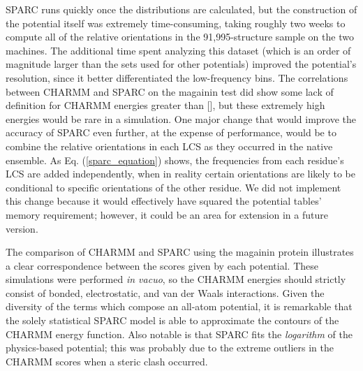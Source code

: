 \documentclass[11pt,titlepage]{article}
\begin{document}
SPARC runs quickly once the distributions are calculated, but the construction of the potential itself was extremely time-consuming, taking roughly two weeks to compute all of the relative orientations in the 91,995-structure sample on the two machines.
The additional time spent analyzing this dataset (which is an order of magnitude larger than the sets used for other potentials) improved the potential's resolution, since it better differentiated the low-frequency bins.
The correlations between CHARMM and SPARC on the magainin test did show some lack of definition for CHARMM energies greater than [], but these extremely high energies would be rare in a simulation.
One major change that would improve the accuracy of SPARC even further, at the expense of performance, would be to combine the relative orientations in each LCS as they occurred in the native ensemble.
As Eq. (\ref{sparc_equation}) shows, the frequencies from each residue's LCS are added independently, when in reality certain orientations are likely to be conditional to specific orientations of the other residue.
We did not implement this change because it would effectively have squared the potential tables' memory requirement; however, it could be an area for extension in a future version.

The comparison of CHARMM and SPARC using the magainin protein illustrates a clear correspondence between the scores given by each potential.
These simulations were performed \textit{in vacuo}, so the CHARMM energies should strictly consist of bonded, electrostatic, and van der Waals interactions.
Given the diversity of the terms which compose an all-atom potential, it is remarkable that the solely statistical SPARC model is able to approximate the contours of the CHARMM energy function.
Also notable is that SPARC fits the \emph{logarithm} of the physics-based potential; this was probably due to the extreme outliers in the CHARMM scores when a steric clash occurred.
\end{document}
